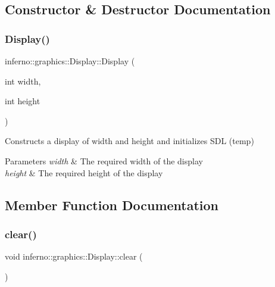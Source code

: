 \subsection{Constructor \& Destructor Documentation}
\mbox{\label{classinferno_1_1graphics_1_1_display_a8209b018b72b97990c10e67054ef813e}} 
\subsubsection{\texorpdfstring{Display()}{Display()}}
{\footnotesize\ttfamily inferno\+::graphics\+::\+Display\+::\+Display (\begin{DoxyParamCaption}\item[{int}]{width,  }\item[{int}]{height }\end{DoxyParamCaption})\hspace{0.3cm}{\ttfamily [inline]}}



Constructs a display of width and height and initializes S\+DL (temp) 


\begin{DoxyParams}{Parameters}
{\em width} & The required width of the display \\
\hline
{\em height} & The required height of the display \\
\hline
\end{DoxyParams}


\subsection{Member Function Documentation}
\mbox{\label{classinferno_1_1graphics_1_1_display_a9197ea5fd4c5b65ebc60f5f4c034794f}} 
\subsubsection{\texorpdfstring{clear()}{clear()}}
{\footnotesize\ttfamily void inferno\+::graphics\+::\+Display\+::clear (\begin{DoxyParamCaption}{ }\end{DoxyParamCaption})\hspace{0.3cm}{\ttfamily [inline]}}



